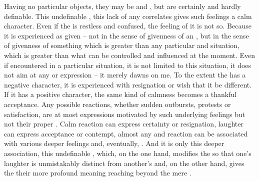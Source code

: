 Having no particular objects, they may be  and , but
are certainly  and hardly definable.  This undefinable ,
this lack of any  correlates gives such feelings a calm character.
Even if the  is restless and confused, the feeling of it is
not so. Because it is experienced as given -- not in the sense of 
givenness of an , but in the sense of givenness of something which is
greater than any particular  and situation, which is greater than
what can be controlled and influenced at the moment. Even if encountered in a
particular situation, it is not limited to this situation, it does not aim
at any  or expression -- it merely dawns on me. To the extent the
 has a negative character, it is experienced with resignation or
wish that it be different. If it has a positive character, the same kind of
calmness becomes a thankful acceptance.  Any possible reactions, whether sudden
outbursts, protests or satisfaction, are at most  expressions motivated by
such underlying feelings but not their proper . Calm reaction can express
certainty or resignation, laughter can express acceptance or contempt, almost
any  and reaction can be associated with various deeper feelings
and, eventually, . And it is only this deeper association, this
undefinable , which, on the one hand, modifies the  so
that one's laughter is unmistakably distinct from another's and, on the other
hand, gives the  their more profound meaning reaching beyond
the mere \hoa. 


